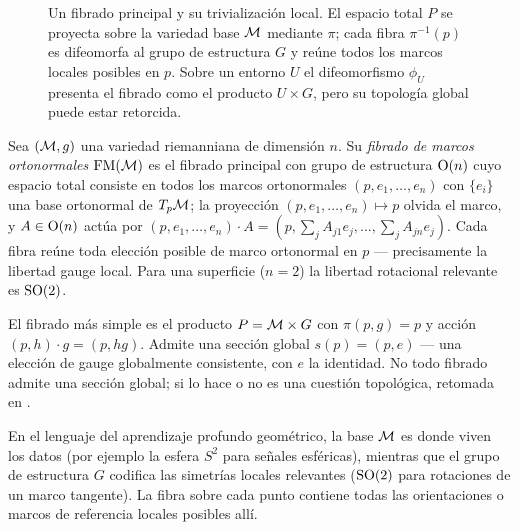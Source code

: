 \begin{figure}[ht]
\caption[Fibrado principal]{Un fibrado principal y su trivializaci\'on local. El
espacio total $P$ se proyecta sobre la variedad base $\mathcal{M}$ mediante $\pi$; cada
fibra $\pi^{-1}(p)$ es difeomorfa al grupo de estructura $G$ y re\'une todos los
marcos locales posibles en $p$. Sobre un entorno $U$ el difeomorfismo
$\phi_U$ presenta el fibrado como el producto $U \times G$, pero su topolog\'ia
global puede estar retorcida.}
\label{fig:gauge:bundle}
\end{figure}

\begin{example}
\label{ex:gauge:frame-bundle}
Sea $(\mathcal{M}, g)$ una variedad riemanniana de dimensi\'on $n$. Su
\emph{fibrado de marcos ortonormales} $\mathrm{FM}(\mathcal{M})$ es el fibrado
principal con grupo de estructura $\operatorname{O}(n)$ cuyo espacio total consiste en todos
los marcos ortonormales $(p, e_1, \ldots, e_n)$ con $\{e_i\}$ una base ortonormal
de $T_p\mathcal{M}$; la proyecci\'on $(p, e_1, \ldots, e_n) \mapsto p$ olvida el marco,
y $A \in \operatorname{O}(n)$ act\'ua por $(p, e_1, \ldots, e_n) \cdot A = (p, \sum_j A_{j1}
e_j, \ldots, \sum_j A_{jn} e_j)$. Cada fibra re\'une toda elecci\'on posible de
marco ortonormal en $p$ --- precisamente la libertad gauge local. Para una
superficie ($n = 2$) la libertad rotacional relevante es $\operatorname{SO}(2)$.
\end{example}

\begin{example}
\label{ex:gauge:trivial-bundle}
El fibrado m\'as simple es el producto $P = \mathcal{M} \times G$ con $\pi(p, g) = p$ y
acci\'on $(p, h) \cdot g = (p, hg)$. Admite una secci\'on global $s(p) = (p, e)$
--- una elecci\'on de gauge globalmente consistente, con $e$ la identidad. No
todo fibrado admite una secci\'on global; si lo hace o no es una cuesti\'on
topol\'ogica, retomada en .
\end{example}

En el lenguaje del aprendizaje profundo geom\'etrico, la base $\mathcal{M}$ es donde
viven los datos (por ejemplo la esfera $S^2$ para se\~nales esf\'ericas),
mientras que el grupo de estructura $G$ codifica las simetr\'ias locales
relevantes ($\operatorname{SO}(2)$ para rotaciones de un marco tangente). La fibra sobre cada
punto contiene todas las orientaciones o marcos de referencia locales posibles
all\'i.

